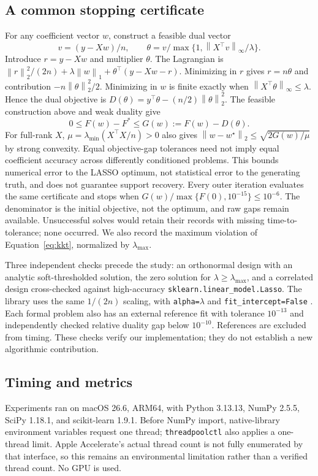 \documentclass{article}
\newcommand{\norm}[1]{\left\|#1\right\|}
\begin{document}
\subsection{A common stopping certificate}
For any coefficient vector $w$, construct a feasible dual vector
\begin{equation}
 v=(y-Xw)/n,\qquad
 \theta=v/\max\{1,\norm{X^\top v}_\infty/\lambda\}.
\end{equation}
Introduce $r=y-Xw$ and multiplier $\theta$. The Lagrangian is $\norm{r}_2^2/(2n)+\lambda\norm{w}_1+\theta^\top(y-Xw-r)$. Minimizing in $r$ gives $r=n\theta$ and contribution $-n\norm{\theta}_2^2/2$. Minimizing in $w$ is finite exactly when $\norm{X^\top\theta}_\infty\le\lambda$. Hence the dual objective is $D(\theta)=y^\top\theta-(n/2)\norm{\theta}_2^2$. The feasible construction above and weak duality give
\begin{equation}
 0\le F(w)-F^*\le G(w):=F(w)-D(\theta).
\end{equation}
For full-rank $X$, $\mu=\lambda_{\min}(X^\top X/n)>0$ also gives $\norm{w-w^\star}_2\le\sqrt{2G(w)/\mu}$ by strong convexity. Equal objective-gap tolerances need not imply equal coefficient accuracy across differently conditioned problems. This bounds numerical error to the LASSO optimum, not statistical error to the generating truth, and does not guarantee support recovery.
Every outer iteration evaluates the same certificate and stops when $G(w)/\max\{F(0),10^{-15}\}\le10^{-6}$. The denominator is the initial objective, not the optimum, and raw gaps remain available. Unsuccessful solves would retain their records with missing time-to-tolerance; none occurred. We also record the maximum violation of Equation~\eqref{eq:kkt}, normalized by $\lambda_{\max}$.

Three independent checks precede the study: an orthonormal design with an analytic soft-thresholded solution, the zero solution for $\lambda\ge\lambda_{\max}$, and a correlated design cross-checked against high-accuracy \texttt{sklearn.linear\_model.Lasso}. The library uses the same $1/(2n)$ scaling, with \texttt{alpha=}$\lambda$ and \texttt{fit\_intercept=False} \citep{sklearnlasso}. Each formal problem also has an external reference fit with tolerance $10^{-13}$ and independently checked relative duality gap below $10^{-10}$. References are excluded from timing. These checks verify our implementation; they do not establish a new algorithmic contribution.

\subsection{Timing and metrics}
Experiments ran on macOS 26.6, ARM64, with Python 3.13.13, NumPy 2.5.5, SciPy 1.18.1, and scikit-learn 1.9.1. Before NumPy import, native-library environment variables request one thread; \texttt{threadpoolctl} also applies a one-thread limit. Apple Accelerate's actual thread count is not fully enumerated by that interface, so this remains an environmental limitation rather than a verified thread count. No GPU is used.
\end{document}
